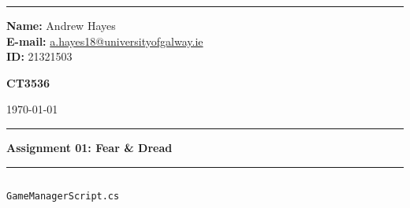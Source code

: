 \documentclass[a4paper, 11pt]{article}
\newenvironment{code}{\captionsetup{type=listing}}{}
\begin{document}
\hrule \medskip
\begin{minipage}{0.295\textwidth} 
    \raggedright
    \footnotesize 
    \textbf{Name:} Andrew Hayes \\
    \textbf{E-mail:} \href{mailto://a.hayes18@universityofgalway.ie}{a.hayes18@universityofgalway.ie}  \hfill\\   
    \textbf{ID:} 21321503 \hfill
\end{minipage}
\begin{minipage}{0.4\textwidth} 
    \centering 
    \vspace{0.4em}
    \Large 
    \textbf{CT3536} \\ 
\end{minipage}
\begin{minipage}{0.295\textwidth} 
    \raggedleft
    \today
\end{minipage}
\medskip\hrule 
\begin{center}
    \normalsize
    \textbf{Assignment 01: Fear \& Dread}
\end{center}
\hrule

\begin{code}
\inputminted[texcl, mathescape, breaklines, frame=single]{csharp}{../GameManagerScript.cs}
\caption{\texttt{GameManagerScript.cs}}
\end{code}
\end{document}
